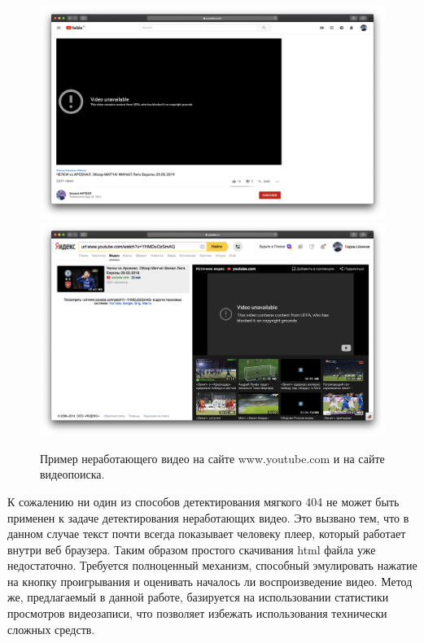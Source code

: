 \begin{figure}
    \centering
    \includegraphics[width=\textwidth]{images/youtube_bad}
    \includegraphics[width=\textwidth]{images/yandex_video_bad}
    \caption{Пример неработающего видео на сайте www.youtube.com и на сайте видеопоиска.}
    \label{fig:bad_video}
\end{figure}

К сожалению ни один из способов детектирования мягкого 404 не может быть применен к задаче детектирования неработающих видео. Это вызвано тем, что в данном случае текст почти всегда показывает человеку плеер, который работает внутри веб браузера. Таким образом простого скачивания html файла уже недостаточно. Требуется полноценный механизм, способный эмулировать нажатие на кнопку проигрывания и оценивать началось ли воспроизведение видео. Метод же, предлагаемый в данной работе, базируется на использовании статистики просмотров видеозаписи, что позволяет избежать использования технически сложных средств.